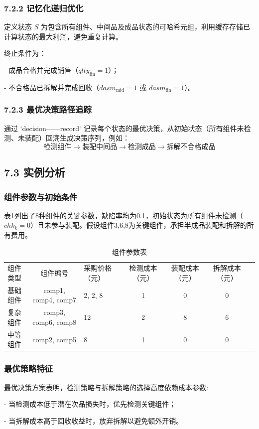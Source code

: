 \documentclass{article}
\begin{document}
	\subsubsection*{7.2.2 记忆化递归优化}  
	定义状态 \(S\) 为包含所有组件、中间品及成品状态的可哈希元组，利用缓存存储已计算状态的最大利润，避免重复计算。\par
	终止条件为：  \par
	- 成品合格并完成销售（\(qlty_{\text{fin}} = 1\)）；  \par
	- 不合格品已拆解并完成回收（\(dasm_{\text{mid}} = 1\) 或 \(dasm_{\text{fin}} = 1\)）。  
	
	\subsubsection*{7.2.3 最优决策路径追踪} 
	通过 `decision——record` 记录每个状态的最优决策，从初始状态（所有组件未检测、未装配）回溯生成决策序列，例如：  
	\[
	\text{检测组件} \rightarrow \text{装配中间品} \rightarrow \text{检测成品} \rightarrow \text{拆解不合格成品}
	\]  
	
	\subsection*{7.3 实例分析}  
	\subsubsection*{组件参数与初始条件}  
	表1列出了8种组件的关键参数，缺陷率均为0.1，初始状态为所有组件未检测（\(chk_k = 0\)）且未参与装配。假设组件3,6,8为关键组件，承担半成品装配和拆解的所有费用。  
	
	\begin{table}[htbp]
		\centering
		\caption{组件参数表}
		\begin{tabular}{lclcccc}
			组件类型 & 组件编号 & 采购价格（元） & 检测成本（元） & 装配成本（元） & 拆解成本（元） \\
			基础组件 & comp1, comp4, comp7 & 2, 2, 8 & 1 & 0 & 0 \\
			复杂组件 & comp3, comp6, comp8 & 12 & 2 & 8 & 6 \\
			中等组件 & comp2, comp5 & 8 & 1 & 0 & 0 \\
		\end{tabular}
	\end{table}
	
	\subsubsection*{最优策略特征}  
	最优决策方案表明，检测策略与拆解策略的选择高度依赖成本参数:\par
	- 当检测成本低于潜在次品损失时，优先检测关键组件；\par  
	- 当拆解成本高于回收收益时，放弃拆解以避免额外开销。  
	
\end{document}
